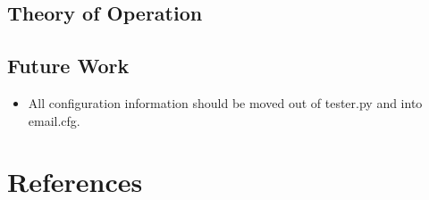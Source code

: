 \documentclass[preprint,3p]{elsarticle}
\begin{document}
\subsection{Theory of Operation}

\subsection{Future Work}
\begin{itemize}
\item All configuration information should be moved out of tester.py
  and into email.cfg.
\end{itemize}

\section*{References}


\end{document}
